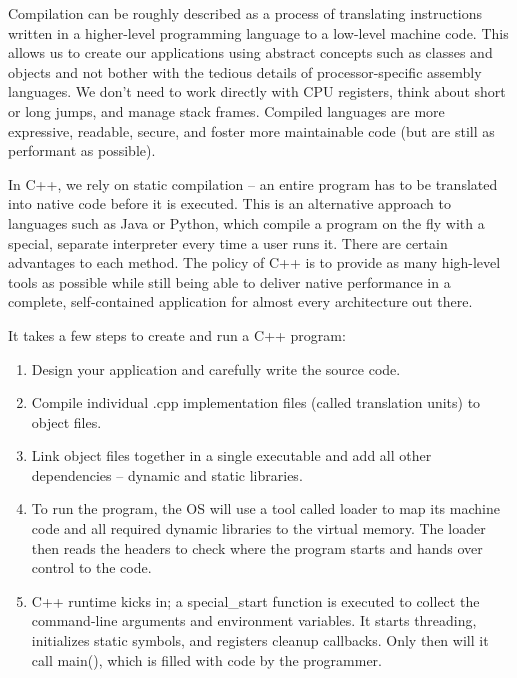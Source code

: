 
Compilation can be roughly described as a process of translating instructions written in a higher-level programming language to a low-level machine code. This allows us to create our applications using abstract concepts such as classes and objects and not bother with the tedious details of processor-specific assembly languages. We don't need to work directly with CPU registers, think about short or long jumps, and manage stack frames. Compiled languages are more expressive, readable, secure, and foster more maintainable code (but are still as performant as possible).

In C++, we rely on static compilation – an entire program has to be translated into native code before it is executed. This is an alternative approach to languages such as Java or Python, which compile a program on the fly with a special, separate interpreter every time a user runs it. There are certain advantages to each method. The policy of C++ is to provide as many high-level tools as possible while still being able to deliver native performance in a complete, self-contained application for almost every architecture out there.

It takes a few steps to create and run a C++ program:

\begin{enumerate}
\item 
Design your application and carefully write the source code.

\item 
Compile individual .cpp implementation files (called translation units) to object files.

\item 
Link object files together in a single executable and add all other dependencies – dynamic and static libraries.

\item 
To run the program, the OS will use a tool called loader to map its machine code and all required dynamic libraries to the virtual memory. The loader then reads the headers to check where the program starts and hands over control to the code.

\item 
C++ runtime kicks in; a special\_start function is executed to collect the command-line arguments and environment variables. It starts threading, initializes static symbols, and registers cleanup callbacks. Only then will it call main(), which is filled with code by the programmer.
\end{enumerate}

